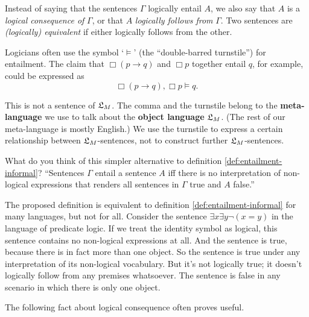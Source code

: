 Instead of saying that the sentences $\Gamma$ logically entail $A$, we also say
that $A$ is a \emph{logical consequence of} $\Gamma$, or that $A$
\emph{logically follows from} $\Gamma$. Two sentences are \emph{(logically)
  equivalent} if either logically follows from the other.

Logicians often use the symbol `$\models$' (the ``double-barred turnstile'') for
entailment. The claim that $\Box (p \to q)$ and $\Box p$ together entail $q$,
for example, could be expressed as
\begin{equation*}
  \Box (p \to q), \Box p \models q.
\end{equation*}

This is not a sentence of $\mathfrak{L}_{M}$. The comma and the turnstile belong to
the \textbf{meta-language} we use to talk about the \textbf{object language}
$\mathfrak{L}_M$. (The rest of our meta-language is mostly English.) We use the turnstile
to express a certain relationship between $\mathfrak{L}_M$-sentences, not to construct
further $\mathfrak{L}_{M}$-sentences.

\begin{exercise}
  What do you think of this simpler alternative to definition
  \ref{def:entailment-informal}? ``Sentences $\Gamma$ entail a sentence $A$ iff
  there is no interpretation of non-logical expressions that renders all
  sentences in $\Gamma$ true and $A$ false.''
\end{exercise}
\begin{solution}
  The proposed definition is equivalent to definition
  \ref{def:entailment-informal} for many languages, but not for all. Consider
  the sentence $\exists x \exists y \neg(x = y)$ in the language of predicate
  logic. If we treat the identity symbol as logical, this sentence contains no
  non-logical expressions at all. And the sentence is true, because there is in
  fact more than one object. So the sentence is true under any interpretation of
  its non-logical vocabulary. But it's not logically true; it doesn't logically
  follow from any premises whatsoever. The sentence is false in any scenario in
  which there is only one object.
\end{solution}

The following fact about logical consequence often proves useful.

